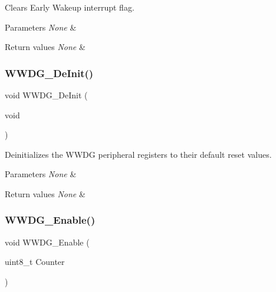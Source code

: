 Clears Early Wakeup interrupt flag. 


\begin{DoxyParams}{Parameters}
{\em None} & \\
\hline
\end{DoxyParams}

\begin{DoxyRetVals}{Return values}
{\em None} & \\
\hline
\end{DoxyRetVals}
\mbox{\label{group___w_w_d_g___private___functions_ga7130f4dc861b9234b62e73f9f57f89a1}} 
\subsubsection{\texorpdfstring{WWDG\_DeInit()}{WWDG\_DeInit()}}
{\footnotesize\ttfamily void W\+W\+D\+G\+\_\+\+De\+Init (\begin{DoxyParamCaption}\item[{void}]{ }\end{DoxyParamCaption})}



Deinitializes the W\+W\+DG peripheral registers to their default reset values. 


\begin{DoxyParams}{Parameters}
{\em None} & \\
\hline
\end{DoxyParams}

\begin{DoxyRetVals}{Return values}
{\em None} & \\
\hline
\end{DoxyRetVals}
\mbox{\label{group___w_w_d_g___private___functions_ga10dc2554d0b504b5472e3ecf0f02a9e6}} 
\subsubsection{\texorpdfstring{WWDG\_Enable()}{WWDG\_Enable()}}
{\footnotesize\ttfamily void W\+W\+D\+G\+\_\+\+Enable (\begin{DoxyParamCaption}\item[{uint8\+\_\+t}]{Counter }\end{DoxyParamCaption})}



